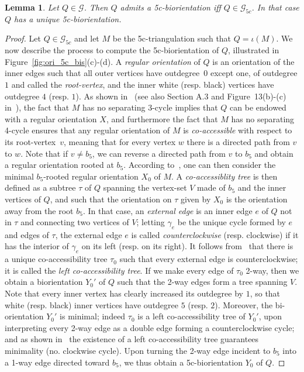 \documentclass[letter]{amsart}
\numberwithin{theo}{section}
\newtheorem{lemma}[theo]{Lemma}
\theoremstyle{remark}
\def\cG{\mathcal{G}}
\def\cGfc{\cG_{5c}}
\begin{document}
\begin{lemma}\label{lem:5cbiori}
Let $Q\in\cG$. Then $Q$ admits a 5c-biorientation iff $Q\in\cGfc$. 
In that case $Q$ has a unique 5c-biorientation.  
\end{lemma}
\begin{proof}
Let $Q\in\cGfc$ and let $M$ be the 5c-triangulation such that $Q=\iota(M)$. We now describe the process to compute the 5c-biorientation of $Q$, illustrated in Figure~\ref{fig:ori_5c_bis}(c)-(d).   
A \emph{regular orientation} of $Q$ is an orientation of the inner edges such that all outer vertices have outdegree~$0$ except one, of outdegree $1$ and called the \emph{root-vertex},  and the inner white (resp. black) vertices have outdegree $4$ (resp. $1$). As shown in~\cite[Sec.12]{OB-EF-SL:Grand-Schnyder} (see also Section A.3 and Figure~13(b)-(c) in~\cite{BernardiFL23}),  the fact that $M$ has no separating 3-cycle implies that $Q$ can be endowed  with a regular orientation $X$, and furthermore the fact that $M$ has no separating 4-cycle ensures that any regular orientation of $M$ is \emph{co-accessible} with respect to its root-vertex~$v$, meaning that for every vertex $w$ there is a directed path from $v$ to $w$. 
Note that if $v\neq b_5$, we can reverse a directed path from $v$ to $b_5$ and obtain a regular orientation rooted at $b_5$. According to~\cite{Felsner:lattice}, one can then consider the minimal $b_5$-rooted regular orientation $X_0$ of $M$. A \emph{co-accessiblity tree} is then defined as a subtree $\tau$ of $Q$ spanning the vertex-set $V$ made of $b_5$ and the inner vertices of $Q$, and such that the orientation on $\tau$ given by $X_0$ is the orientation away from the root $b_5$. In that case, an \emph{external edge} is an inner edge $e$ of $Q$ not in $\tau$ and connecting two vertices of $V$; letting $\gamma_e$ be the unique cycle formed by $e$ and edges of $\tau$, the external edge $e$ is called \emph{counterclockwise} (resp. clockwise) if it has the interior of $\gamma_e$ on its left (resp. on its right). 
It follows from~\cite{Bernardi07} that there is a unique co-accessibility tree $\tau_0$ such that every external edge is counterclockwise; it is called the \emph{left co-accessibility tree}.  If we make every edge of $\tau_0$ 2-way, then we obtain a biorientation $Y_0'$ of $Q$ such that the 2-way edges form a tree spanning $V$. Note that every inner vertex has clearly increased its outdegree by $1$, so that white (resp. black) inner vertices
 have outdegree $5$ (resp. $2$). Moreover, the bi-orientation $Y_0'$ is minimal; 
 indeed $\tau_0$ is a left co-accessibility tree of $Y_0'$, upon interpreting every 2-way edge as a double edge forming a counterclockwise cycle; and as shown in~\cite{Bernardi07} the existence of a left co-accessibility tree guarantees minimality (no. clockwise cycle). Upon turning the 2-way edge incident to $b_5$ into a 1-way edge directed toward $b_5$, we thus obtain a 5c-biorientation $Y_0$ of $Q$.  
  

\end{proof}
\end{document}
